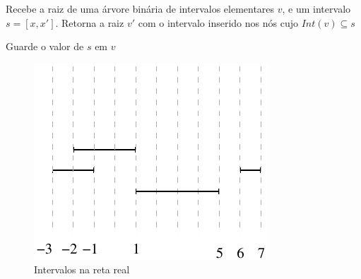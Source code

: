  
\begin{algorithm}[h!]
    \caption{Recebe a raiz de uma árvore binária de intervalos elementares $v$, e um intervalo $s = [x, x']$. Retorna a raiz $v'$ com o intervalo inserido nos nós cujo $Int(v) \subseteq  s$}
    \begin{algorithmic}[1]
                \State Guarde o valor de $s$ em $v$
            \Else
                    \State {}
                \EndIf
                
                    \State {}
                \EndIf
            \EndIf
        \EndFunction
    \end{algorithmic}
\end{algorithm}

\begin{figure}
    \centering
    \includegraphics[scale=0.8]{images/exemple_segments.pdf}
    \caption{Intervalos na reta real}
    \label{fig:intervals}
\end{figure}

